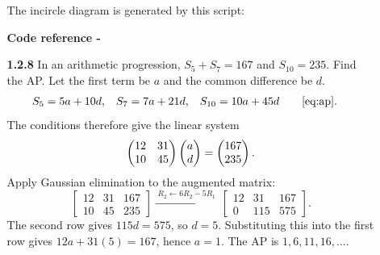 \begin{enumerate}[label={},leftmargin=0pt]
\begin{enumerate}[label={},leftmargin=0pt,itemsep=9pt]
The incircle diagram is generated by this script:
\par\smallskip
\noindent\textbf{Code reference -}
\par\noindent{}
\par\smallskip
\newpage
\setcounter{enumii}{8}
\setcounter{equation}{0}
\item[\textbf{1.2.8}] In an arithmetic progression, $S_5+S_7=167$ and $S_{10}=235$. Find the AP.
\solution Let the first term be $a$ and the common difference be $d$.
\begin{align}
S_5&=5a+10d, & S_7&=7a+21d, & S_{10}&=10a+45d\qquad\eqref{eq:ap}.
\end{align}
The conditions therefore give the linear system
\begin{equation}
\begin{pmatrix}12&31\\10&45\end{pmatrix}\begin{pmatrix}a\\d\end{pmatrix}=\begin{pmatrix}167\\235\end{pmatrix}.\label{eq:q8system}
\end{equation}
Apply Gaussian elimination to the augmented matrix:
\begin{equation}
\left[\begin{array}{cc|c}12&31&167\\10&45&235\end{array}\right]
\xrightarrow{\;R_2\leftarrow6R_2-5R_1\;}
\left[\begin{array}{cc|c}12&31&167\\0&115&575\end{array}\right].
\end{equation}
The second row gives $115d=575$, so $d=5$. Substituting this into the first row gives $12a+31(5)=167$, hence $a=1$. The AP is $1,6,11,16,\ldots$.




\end{enumerate}
\end{enumerate}
